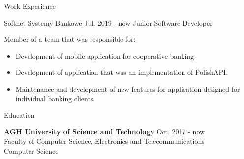 \documentclass{resume} %
\begin{document}

\begin{rSection}
{Work Experience}

\begin{rSubsection}
{Softnet Systemy Bankowe}
{Jul. 2019 - now}
{Junior Software Developer}

{Member of a team that was responsible for:}

\begin{itemize}
 \setlength\itemsep{-0.5em}

\item {Development of mobile application for cooperative banking}

\item {Development of application that was an implementation of PolishAPI.}

\item {Maintenance and development of new features for application designed for individual banking clients.}
\end{itemize}
\end{rSubsection}

\end{rSection}


\begin{rSection}{Education}

{\bf AGH University of Science and Technology} \hfill {Oct. 2017 - now} 
\\ Faculty of Computer Science, Electronics and Telecommunications
\\ Computer Science

\end{rSection}
\end{document}
